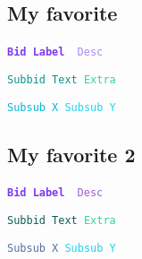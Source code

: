 \documentclass{article}
\begin{document}
\subsection*{My favorite}
\noindent
\texttt{\bfseries {\textcolor[HTML]{7C3AED}{Bid Label}}}\ {\texttt{\textcolor[HTML]{A78BFA}{\small\ Desc}}}\par
\texttt{\small {\textcolor[HTML]{0D9488}{Subbid Text}}\ {\textcolor[HTML]{34D399}{Extra}}}\par
\texttt{\small {\textcolor[HTML]{06B6D4}{Subsub X}}\ {\textcolor[HTML]{22D3EE}{Subsub Y}}}\par

\subsection*{My favorite 2}
\noindent
\texttt{\bfseries {\textcolor[HTML]{7C3AED}{Bid Label}}}\ {\texttt{\textcolor[HTML]{A25DD0}{\small\ Desc}}}\par
\texttt{\small {\textcolor[HTML]{085D53}{Subbid Text}}\ {\textcolor[HTML]{34D399}{Extra}}}\par
\texttt{\small {\textcolor[HTML]{59709C}{Subsub X}}\ {\textcolor[HTML]{22D3EE}{Subsub Y}}}\par
\end{document}
